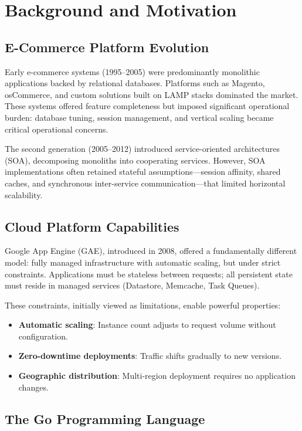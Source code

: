 \documentclass[11pt,twocolumn]{article}
\begin{document}
\section{Background and Motivation}

\subsection{E-Commerce Platform Evolution}

Early e-commerce systems (1995--2005) were predominantly monolithic applications backed by relational databases. Platforms such as Magento, osCommerce, and custom solutions built on LAMP stacks dominated the market. These systems offered feature completeness but imposed significant operational burden: database tuning, session management, and vertical scaling became critical operational concerns.

The second generation (2005--2012) introduced service-oriented architectures (SOA), decomposing monoliths into cooperating services. However, SOA implementations often retained stateful assumptions—session affinity, shared caches, and synchronous inter-service communication—that limited horizontal scalability.

\subsection{Cloud Platform Capabilities}

Google App Engine (GAE), introduced in 2008, offered a fundamentally different model: fully managed infrastructure with automatic scaling, but under strict constraints. Applications must be stateless between requests; all persistent state must reside in managed services (Datastore, Memcache, Task Queues).

These constraints, initially viewed as limitations, enable powerful properties:
\begin{itemize}
\item \textbf{Automatic scaling}: Instance count adjusts to request volume without configuration.
\item \textbf{Zero-downtime deployments}: Traffic shifts gradually to new versions.
\item \textbf{Geographic distribution}: Multi-region deployment requires no application changes.
\end{itemize}

\subsection{The Go Programming Language}
\end{document}
